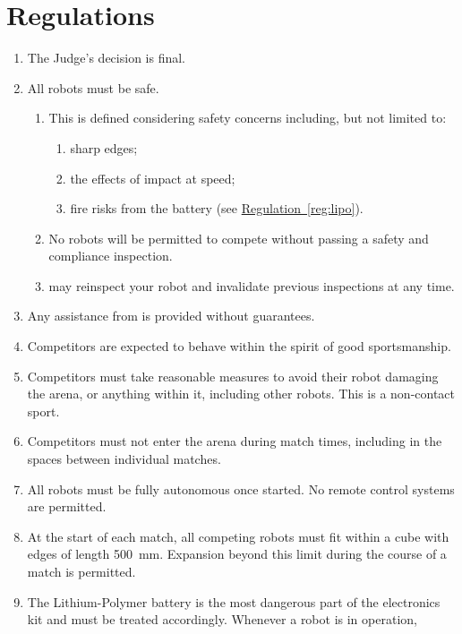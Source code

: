 \section{Regulations}
\label{sec:regs}

\begin{enumerate}
\item The Judge's decision is final.
\item All robots must be safe.
  \begin{enumerate}
    \item This is defined considering safety concerns including, but not limited
          to:
      \begin{enumerate}
        \item sharp edges;
        \item the effects of impact at speed;
        \item fire risks from the battery (see
              \hyperref[reg:lipo]{Regulation~\ref*{reg:lipo}}).
      \end{enumerate}
    \item No robots will be permitted to compete without passing a safety and
          compliance inspection.
    \item \staff may reinspect your robot and invalidate previous inspections at
          any time.
  \end{enumerate}
\item Any assistance from \staff is provided without
      guarantees.
\item Competitors are expected to behave within the spirit of good
      sportsmanship.
\item Competitors must take reasonable measures to avoid their robot damaging
      the arena, or anything within it, including other robots. This is a
      non-contact sport.
\item Competitors must not enter the arena during match times, including in the
      spaces between individual matches.
\item All robots must be fully autonomous once started. No remote control
      systems are permitted.
\item At the start of each match, all competing robots must fit within a cube
      with edges of length \SI{500}{mm}. Expansion beyond this limit during the
      course of a match is permitted.
\item \label{reg:lipo}
      The Lithium-Polymer battery is the most dangerous part of the electronics
      kit and must be treated accordingly. Whenever a robot is in operation,

\end{enumerate}
